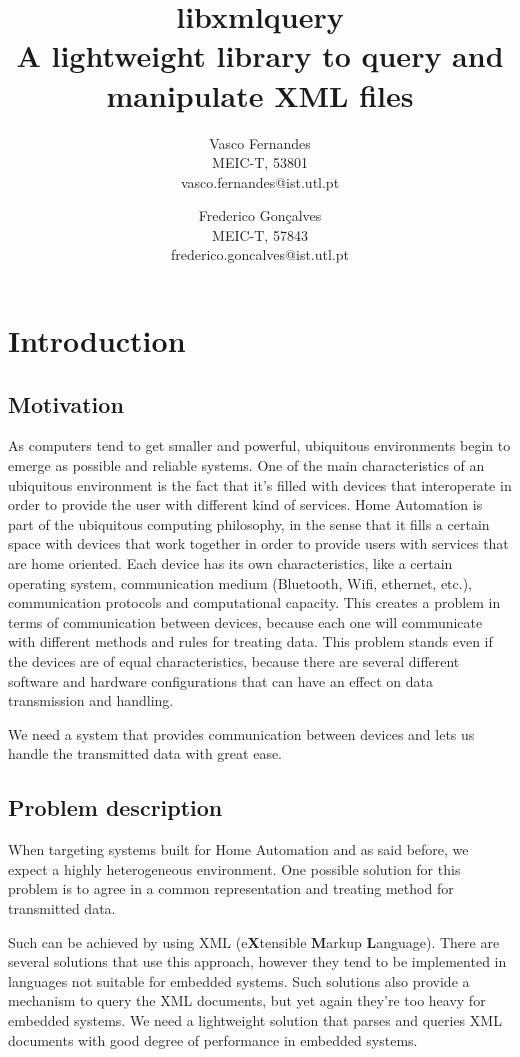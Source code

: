 \documentclass[a4paper]{report}
\title{\textbf{\Huge{libxmlquery}}\\A lightweight library to query and manipulate XML files}
\author{
Vasco Fernandes\\
MEIC-T, 53801\\
vasco.fernandes@ist.utl.pt \\
\and
Frederico Gon\c{c}alves\\
MEIC-T, 57843\\
frederico.goncalves@ist.utl.pt\\
}
\begin{document}
\maketitle

\tableofcontents

\chapter{Introduction}

\section{Motivation} %
	As computers tend to get smaller and powerful, ubiquitous environments begin to emerge as possible and reliable systems. One of the main characteristics of an ubiquitous environment is the fact that it's filled with
	devices that interoperate in order to provide the user with different kind of services. Home Automation is part of the ubiquitous computing philosophy, in the sense that it fills a certain space with devices that work together in
	order to provide users with services that are home oriented. Each device has its own characteristics, like a certain operating system, communication medium (Bluetooth, Wifi, ethernet, etc.), communication protocols and
	computational 	capacity. This creates a problem in terms of communication between devices, because each one will communicate with different methods and rules for treating data. This problem stands even if the devices
	are of equal characteristics, because there are several different software and hardware configurations that can have an effect on data transmission and handling.

	We need a system that provides communication between devices and lets us handle the transmitted data with great ease.

\section{Problem description}
	When targeting systems built for Home Automation and as said before, we expect a highly heterogeneous environment. One possible solution for this problem is to agree in a common representation and treating method
	for transmitted data.

	Such can be achieved by using XML (e\textbf{X}tensible \textbf{M}arkup \textbf{L}anguage). There are several solutions that use this approach, however they tend to be implemented in languages not suitable for
	embedded systems. Such solutions also provide a mechanism to query the XML documents, but yet again they're too heavy for embedded systems. We need a lightweight solution that parses and queries XML
	documents with good degree of performance in embedded systems.
\end{document}
